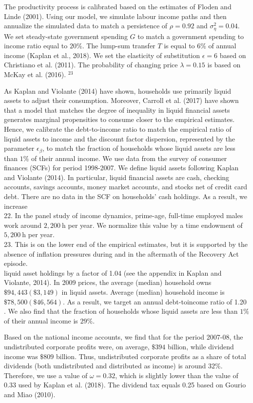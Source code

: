 \documentclass[10pt]{article}
\begin{document}
The productivity process is calibrated based on the estimates of Floden and Linde (2001). Using our model, we simulate labour income paths and then annualize the simulated data to match a persistence of $\rho=0.92$ and $\sigma_{\eta}^{2}=0.04$. We set steady-state government spending $G$ to match a government spending to income ratio equal to $20 \%$. The lump-sum transfer $T$ is equal to $6 \%$ of annual income (Kaplan et al., 2018). We set the elasticity of substitution $\epsilon=6$ based on Christiano et al. (2011). The probability of changing price $\lambda=0.15$ is based on McKay et al. (2016). ${ }^{23}$

As Kaplan and Violante (2014) have shown, households use primarily liquid assets to adjust their consumption. Moreover, Carroll et al. (2017) have shown that a model that matches the degree of inequality in liquid financial assets generates marginal propensities to consume closer to the empirical estimates. Hence, we calibrate the debt-to-income ratio to match the empirical ratio of liquid assets to income and the discount factor dispersion, represented by the parameter $\epsilon_{\beta}$, to match the fraction of households whose liquid assets are less than $1 \%$ of their annual income. We use data from the survey of consumer finances (SCFs) for period 1998-2007. We define liquid assets following Kaplan and Violante (2014). In particular, liquid financial assets are cash, checking accounts, savings accounts, money market accounts, and stocks net of credit card debt. There are no data in the SCF on households' cash holdings. As a result, we increase\\
22. In the panel study of income dynamics, prime-age, full-time employed males work around $2,200 \mathrm{~h}$ per year. We normalize this value by a time endowment of $5,200 \mathrm{~h}$ per year.\\
23. This is on the lower end of the empirical estimates, but it is supported by the absence of inflation pressures during and in the aftermath of the Recovery Act episode.\\
liquid asset holdings by a factor of 1.04 (see the appendix in Kaplan and Violante, 2014). In 2009 prices, the average (median) household owns $\$ 94,443(\$ 3,149)$ in liquid assets. Average (median) household income is $\$ 78,500(\$ 46,564)$. As a result, we target an annual debt-toincome ratio of 1.20 . We also find that the fraction of households whose liquid assets are less than $1 \%$ of their annual income is $29 \%$.

Based on the national income accounts, we find that for the period 2007-08, the undistributed corporate profits were, on average, $\$ 394$ billion, while dividend income was $\$ 809$ billion. Thus, undistributed corporate profits as a share of total dividends (both undistributed and distributed as income) is around $32 \%$. Therefore, we use a value of $\omega=0.32$, which is slightly lower than the value of 0.33 used by Kaplan et al. (2018). The dividend tax equals 0.25 based on Gourio and Miao (2010).
\end{document}
